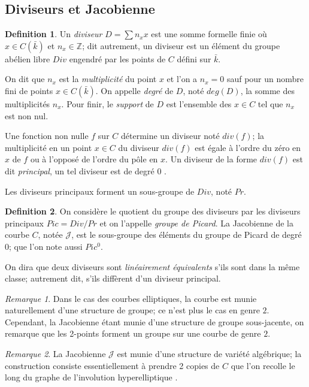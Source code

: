 \documentclass[a4paper,12pt]{article}
\theoremstyle{definition}
\newtheorem{definition}{Definition}[section]
\theoremstyle{remark}
\newtheorem{remarque}{Remarque}
\numberwithin{equation}{section}
\begin{document}
\subsection{Diviseurs et Jacobienne}

\begin{definition}
Un \emph{diviseur} $D = \sum n_x x$ est une somme formelle finie où $x \in C(\bar{k})$ et $n_x \in \mathbb{Z}$; dit autrement, un diviseur est un élément du groupe abélien libre $Div$ engendré par les points de $C$ défini sur $\bar{k}$.

On dit que $n_x$ est la \emph{multiplicité} du point $x$ et l'on a $n_x = 0$ sauf pour un nombre fini de points $x \in C(\bar{k})$. On appelle \emph{degré} de $D$, noté $deg(D)$, la somme des multiplicités $n_x$. Pour finir, le \emph{support} de $D$ est l'ensemble des $x \in C$ tel que $n_x$ est non nul.
\end{definition}

Une fonction non nulle $f$ sur $C$ détermine un diviseur noté $div(f)$; la multiplicité en un point $x \in C$ du diviseur $div(f)$ est égale à l'ordre du zéro en $x$ de $f$ ou à l'opposé de l'ordre du pôle en $x$. Un diviseur de la forme $div(f)$ est dit \emph{principal}, un tel diviseur est de degré 0 \citep{menezes}.

Les diviseurs principaux forment un sous-groupe de $Div$, noté $Pr$.
\begin{definition}
On considère le quotient du groupe des diviseurs par les diviseurs principaux $Pic = Div/Pr$ et on l'appelle \emph{groupe de Picard}.
La Jacobienne de la courbe $C$, notée $\mathcal{J}$, est le sous-groupe des éléments du groupe de Picard de degré 0; que l'on note aussi $Pic^0$.
\end{definition}

On dira que deux diviseurs sont \emph{linéairement équivalents} s'ils sont dans la même classe; autrement dit, s'ils diffèrent d'un diviseur principal.

\begin{remarque}
Dans le cas des courbes elliptiques, la courbe est munie naturellement d'une structure de groupe; ce n'est plus le cas en genre $2$. Cependant, la Jacobienne étant munie d'une structure de groupe sous-jacente, on remarque que les 2-points forment un groupe sur une courbe de genre $2$.
\end{remarque}

\begin{remarque}
La Jacobienne $\mathcal{J}$ est munie d'une structure de variété algébrique; la construction consiste essentiellement à prendre 2 copies de $C$ que l'on recolle le long du graphe de l'involution hyperelliptique \citep{cassels-Flynn}.
\end{remarque}
\end{document}
